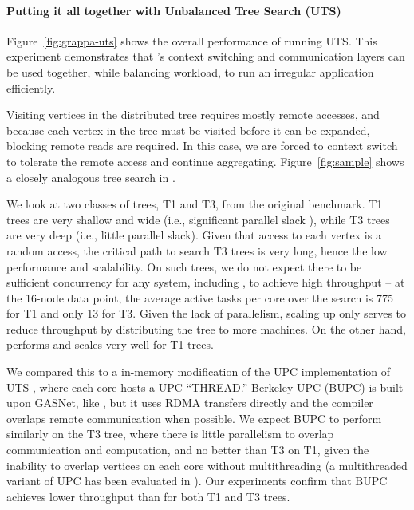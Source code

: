 \paragraph{Putting it all together with Unbalanced Tree Search (UTS)} 
Figure~\ref{fig:grappa-uts} shows the overall performance of \Grappa running
UTS. This experiment demonstrates that \Grappa's context
switching and communication layers can be used together, while
balancing workload, to run an irregular application efficiently. 

Visiting vertices in the distributed tree requires mostly remote
accesses, and because each vertex in the tree must be visited before
it can be expanded, blocking remote reads are required. In this case,
we are forced to context switch to tolerate the remote access and
continue aggregating. Figure~\ref{fig:sample} shows a closely analogous tree search in \Grappa.

We look at two classes of trees, T1 and T3, from
the original benchmark. T1 trees are very shallow and wide (i.e., significant
parallel slack \cite{Valiant:1990}), while T3 trees are very deep (i.e., little parallel slack).
Given that access to each vertex is a random access, the critical path to search
T3 trees is very long, hence the low performance and scalability. On such
trees, we do not expect there to be sufficient concurrency for any system,
including \Grappa, to achieve high throughput -- at the 16-node data point,
the average active tasks per core over the search is 775 for T1 and
only 13 for T3. Given the lack of parallelism, scaling up only serves
to reduce throughput by distributing the tree to more machines.
On the other hand, \Grappa performs and scales very well for T1
trees.

We compared this to a in-memory modification of the UPC implementation
of UTS \cite{UTS}, where each core hosts a UPC ``THREAD.'' Berkeley
UPC (BUPC) is built upon GASNet, like \Grappa, but it uses RDMA transfers directly
and the compiler overlaps remote communication when possible. We expect BUPC to
perform similarly on the T3 tree, where there is little parallelism to
overlap communication and computation, and no better than T3 on T1,
given the inability to overlap vertices on each core without
multithreading (a multithreaded variant of UPC has been evaluated in
\cite{HotSLAW}). Our experiments confirm that BUPC achieves lower throughput than
\Grappa for both T1 and T3 trees.


